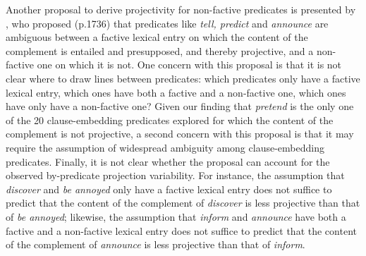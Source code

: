 \documentclass[11pt,fleqn]{article}
\newcommand{\6}{\mbox{$[\hspace*{-.6mm}[$}}
\newcommand{\9}{\mbox{$]\hspace*{-.6mm}]$}}
\begin{document}
{Another proposal to derive projectivity for non-factive predicates is presented by \citet{spector-egre2015}, who proposed (p.1736) that predicates like {\em tell, predict} and {\em announce}  are ambiguous between a factive lexical entry on which the content of the complement is entailed and presupposed, and thereby projective, and a non-factive one on which it is not. One concern with this proposal is that it is not clear where to draw lines between predicates: which predicates only have a factive lexical entry, which ones have both a factive and a non-factive one, which ones have only have a non-factive one? Given our finding that {\em pretend} is the only one of the 20 clause-embedding predicates explored for which the content of the complement is not projective, a second concern with this proposal is that it may require the assumption of widespread ambiguity among clause-embedding predicates. Finally, it is not clear whether the proposal can account for the observed by-predicate projection variability. For instance, the assumption that {\em discover} and {\em be annoyed} only have a factive lexical entry does not suffice to predict that the content of the complement of {\em discover} is less projective than that of {\em be annoyed}; likewise, the assumption that {\em inform} and {\em announce} have both a factive and a non-factive lexical entry does not suffice to predict that the content of the complement of {\em announce} is less projective than that of {\em inform}.

}
\end{document}
